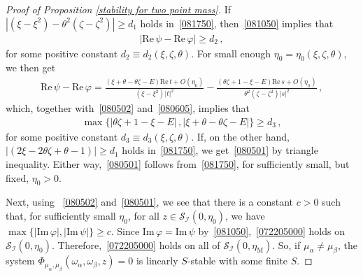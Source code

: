 \documentclass[10pt,reqno]{amsart}
\numberwithin{equation}{section}
\theoremstyle{plain}
\numberwithin{kevin}{section}
\theoremstyle{remark}
\renewcommand{\Re}{\mathrm{Re}\,}
\renewcommand{\Im}{\mathrm{Im}\,}
\newcommand{\im}{\mathrm{Im}\,}
\newcommand{\PP}{\Phi}
\begin{document}
\begin{proof}[Proof of Proposition \ref{stability for two point mass}]
If~$|(\xi-\xi^2)-\theta^2(\zeta-\zeta^2)|\geq d_1$ holds in~\eqref{081750}, then~\eqref{081050} implies that
\begin{align}
|\Re \psi-\Re \varphi|\geq d_2\,,\label{080605}
\end{align}
for some positive constant $d_2\equiv d_2(\xi,\zeta,\theta)$. For small enough $\eta_0=\eta_0(\xi,\zeta,\theta)$, we then get
\begin{align*}
\Re \psi-\Re \varphi=\frac{(\xi+\theta-\theta \zeta-E)\Re t+O(\eta_0)}{(\xi-\xi^2)|t|^2}-\frac{(\theta \zeta+1-\xi-E)\Re s+O(\eta_0)}{\theta^2(\zeta-\zeta^2)|s|^2}\,,
\end{align*}
which, together with~\eqref{080502} and~\eqref{080605}, implies that
\begin{align}
\max\big\{|\theta \zeta+1-\xi-E|\,,|\xi+\theta-\theta \zeta-E| \big\}\geq d_3\,, \label{080501}
\end{align}
for some positive constant $d_3\equiv d_3(\xi,\zeta,\theta)$. If, on the other hand, $|(2\xi-2\theta \zeta+\theta-1)|\geq d_1$ holds in~\eqref{081750}, we get~\eqref{080501} by triangle inequality. Either way,~\eqref{080501} follows from~\eqref{081750}, for sufficiently small, but fixed, $\eta_0>0$.

Next, using ~\eqref{080502} and~\eqref{080501}, we see that there is a constant $c>0$ such that, for sufficiently small $\eta_0$, for all $z\in \mathcal{S}_{\mathcal{I}}(0,\eta_0)$, we have $\max\{|\Im \varphi|,|\Im \psi|\}\geq c$. Since $\im \varphi=\im \psi$ by~\eqref{081050},~\eqref{072205000} holds on $\mathcal{S}_{\mathcal{I}}(0,\eta_0)$.  Therefore,~\eqref{072205000} holds on all of $\mathcal{S}_{\mathcal{I}}(0,\eta_{\mathrm{M}})$.
So, if $\mu_\alpha\not=\mu_\beta$, the system $\PP_{\mu_\alpha,\mu_\beta}(\omega_\alpha,\omega_\beta, z)=0$ is linearly $S$-stable with some finite $S$.


\end{proof}
\end{document}
